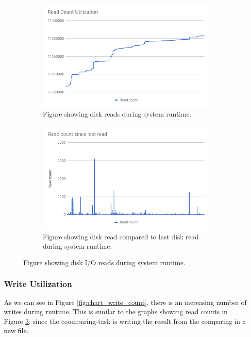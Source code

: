 \documentclass[USenglish]{uit-thesis}
\begin{document}
\begin{figure}
\centering
\begin{subfigure}[b]{1\textwidth}
   \includegraphics[width=1\textwidth]{chart_read_count.png}
   \caption{Figure showing disk reads during system runtime.}
   \label{fig:chart_read_count} 
\end{subfigure}

\begin{subfigure}[b]{1\textwidth}
   \includegraphics[width=1\textwidth]{chart_read_count_since_last.png}
   \caption{Figure showing disk read compared to last disk read during system runtime.}
   \label{fig:chart_read_count_since_last}
\end{subfigure}

\caption{Figure showing disk I/O reads during system runtime.}
\label{fig:read_disks}
\end{figure}


\subsubsection{Write Utilization}
As we can see in Figure \ref{fig:chart_write_count}, there is an increasing number of writes during runtime. This is similar to the graphs showing read counts in Figure \ref{fig:read_disks}, since the coomparing-task is writing the result from the comparing in a new file. 
\end{document}
